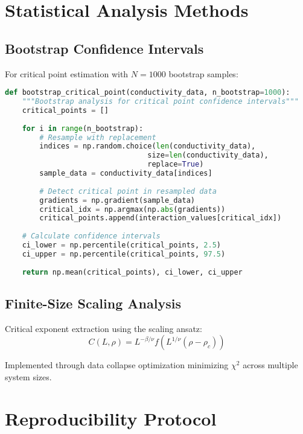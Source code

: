 \documentclass[twocolumn,showpacs,preprintnumbers,amsmath,amssymb,prb]{revtex4-2}
\begin{document}
\section{Statistical Analysis Methods}
\label{app:statistics}

\subsection{Bootstrap Confidence Intervals}

For critical point estimation with $N=1000$ bootstrap samples:

\begin{lstlisting}[language=Python, caption=Bootstrap critical point analysis]
def bootstrap_critical_point(conductivity_data, n_bootstrap=1000):
    """Bootstrap analysis for critical point confidence intervals"""
    critical_points = []
    
    for i in range(n_bootstrap):
        # Resample with replacement
        indices = np.random.choice(len(conductivity_data), 
                                 size=len(conductivity_data), 
                                 replace=True)
        sample_data = conductivity_data[indices]
        
        # Detect critical point in resampled data
        gradients = np.gradient(sample_data)
        critical_idx = np.argmax(np.abs(gradients))
        critical_points.append(interaction_values[critical_idx])
    
    # Calculate confidence intervals
    ci_lower = np.percentile(critical_points, 2.5)
    ci_upper = np.percentile(critical_points, 97.5)
    
    return np.mean(critical_points), ci_lower, ci_upper
\end{lstlisting}

\subsection{Finite-Size Scaling Analysis}

Critical exponent extraction using the scaling ansatz:
\begin{equation}
C(L, \rho) = L^{-\beta/\nu} f\left(L^{1/\nu}(\rho - \rho_c)\right)
\end{equation}

Implemented through data collapse optimization minimizing $\chi^2$ across multiple system sizes.

\section{Reproducibility Protocol}
\label{app:reproducibility}
\end{document}
